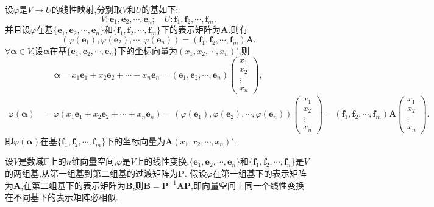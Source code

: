 \documentclass[../../main.tex]{subfiles}%
\begin{document}
\begin{corollary}
设\(\varphi\)是\(V\rightarrow U\)的线性映射,分别取\(V\)和\(U\)的基如下:
\[
V: \boldsymbol{e}_1, \boldsymbol{e}_2, \cdots, \boldsymbol{e}_n; \quad U: \boldsymbol{f}_1, \boldsymbol{f}_2, \cdots, \boldsymbol{f}_m.
\]
并且设\(\varphi\)在基\(\{\boldsymbol{e}_1, \boldsymbol{e}_2, \cdots, \boldsymbol{e}_n\}\)和\(\{\boldsymbol{f}_1, \boldsymbol{f}_2, \cdots, \boldsymbol{f}_m\}\)下的表示矩阵为\(\boldsymbol{A}\).则有
\[
(\varphi(\boldsymbol{e}_1), \varphi(\boldsymbol{e}_2), \cdots, \varphi(\boldsymbol{e}_n)) = (\boldsymbol{f}_1, \boldsymbol{f}_2, \cdots, \boldsymbol{f}_m)\boldsymbol{A}.
\]
\(\forall \boldsymbol{\alpha} \in V\),设\(\boldsymbol{\alpha}\)在基\(\{\boldsymbol{e}_1, \boldsymbol{e}_2, \cdots, \boldsymbol{e}_n\}\)下的坐标向量为\((x_1, x_2, \cdots, x_n)'\),则
\[
\boldsymbol{\alpha} = x_1\boldsymbol{e}_1 + x_2\boldsymbol{e}_2 + \cdots + x_n\boldsymbol{e}_n = (\boldsymbol{e}_1, \boldsymbol{e}_2, \cdots, \boldsymbol{e}_n)\begin{pmatrix}
x_1 \\
x_2 \\
\vdots \\
x_n
\end{pmatrix},
\]
\begin{align*}
\varphi(\boldsymbol{\alpha}) &= \varphi(x_1\boldsymbol{e}_1 + x_2\boldsymbol{e}_2 + \cdots + x_n\boldsymbol{e}_n)
= (\varphi(\boldsymbol{e}_1), \varphi(\boldsymbol{e}_2), \cdots, \varphi(\boldsymbol{e}_n))\begin{pmatrix}
x_1 \\
x_2 \\
\vdots \\
x_n
\end{pmatrix} 
= (\boldsymbol{f}_1, \boldsymbol{f}_2, \cdots, \boldsymbol{f}_m)\boldsymbol{A}\begin{pmatrix}
x_1 \\
x_2 \\
\vdots \\
x_n
\end{pmatrix}.
\end{align*}
即\(\varphi(\boldsymbol{\alpha})\)在基\(\{\boldsymbol{f}_1, \boldsymbol{f}_2, \cdots, \boldsymbol{f}_m\}\)下的坐标向量为\(\boldsymbol{A}(x_1, x_2, \cdots, x_n)'\).
\end{corollary}

\begin{theorem}\label{theorem:向量空间上同一个线性变换在不同基下的表示矩阵必相似}
设\(V\)是数域\(\mathbb{F}\)上的\(n\)维向量空间,\(\varphi\)是\(V\)上的线性变换,\(\{\boldsymbol{e}_1,\boldsymbol{e}_2,\cdots,\boldsymbol{e}_n\}\)和\(\{\boldsymbol{f}_1,\boldsymbol{f}_2,\cdots,\boldsymbol{f}_n\}\)是\(V\)的两组基,从第一组基到第二组基的过渡矩阵为\(\boldsymbol{P}\). 假设\(\varphi\)在第一组基下的表示矩阵为\(\boldsymbol{A}\),在第二组基下的表示矩阵为\(\boldsymbol{B}\),则\(\boldsymbol{B}=\boldsymbol{P}^{-1}\boldsymbol{A}\boldsymbol{P}\),即向量空间上同一个线性变换在不同基下的表示矩阵必相似.
\end{theorem}
\end{document}

